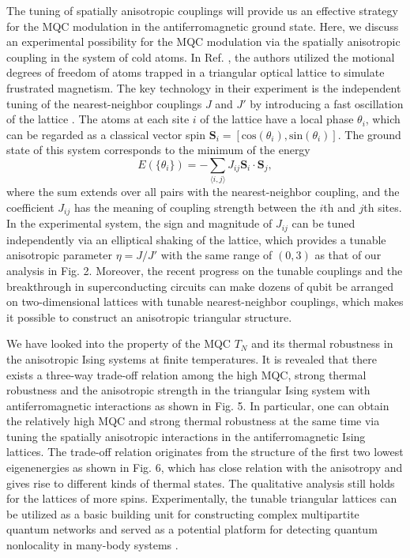 \documentclass[pra,aps,twocolumn,showpacs]{revtex4}
\begin{document}
The tuning of spatially anisotropic couplings will provide us an effective strategy for the MQC modulation in the antiferromagnetic ground state. Here, we discuss an experimental possibility for the MQC modulation via the spatially anisotropic coupling in the system of cold atoms. In Ref. \cite{Struck11sci}, the authors utilized the motional degrees of freedom of atoms trapped in a triangular optical lattice to simulate frustrated magnetism. The key technology in their experiment is the independent tuning of the nearest-neighbor couplings $J$ and $J'$ by introducing a fast oscillation of the lattice \cite{eckardt10epl}. The atoms at each site $i$ of the lattice have a local phase $\theta_i$, which can be regarded as a classical vector spin $\textbf{S}_i=[\mbox{cos}(\theta_i), \mbox{sin}(\theta_i)]$. The ground state of this system corresponds to the minimum of the energy \cite{Struck11sci}
\begin{equation}
    E(\{\theta_i\})=-\sum_{\langle i, j\rangle} J_{i j} \mathbf{S}_{i} \cdot \mathbf{S}_{j},
\end{equation}
where the sum extends over all pairs with the nearest-neighbor coupling, and the coefficient $J_{ij}$ has the meaning of coupling strength between the $i$th and $j$th sites. In the experimental system, the sign and magnitude of $J_{ij}$ can be tuned independently via an elliptical shaking of the lattice, which provides a tunable anisotropic parameter $\eta=J/J'$ with the same range of $(0,3)$ as that of our analysis in Fig. 2. Moreover, the recent progress on the tunable couplings \cite{chen14prl,Guo19prl,li20prapp} and the breakthrough in superconducting circuits \cite{Arute19nat,gong21sci,wu21prl,zhang22nat,feng22prapp} can make dozens of qubit be arranged on two-dimensional lattices with tunable nearest-neighbor couplings, which makes it possible to construct an anisotropic triangular structure.

We have looked into the property of the MQC $T_N$ and its thermal robustness in the anisotropic Ising systems at finite temperatures. It is revealed that there exists a three-way trade-off relation among the high MQC, strong thermal robustness and the anisotropic strength in the triangular Ising system with antiferromagnetic interactions as shown in Fig. 5. In particular, one can obtain the relatively high MQC and strong thermal robustness at the same time via tuning the spatially anisotropic interactions in the antiferromagnetic Ising lattices. The trade-off relation originates from the structure of the first two lowest eigenenergies as shown in Fig. 6, which has close relation with the anisotropy and gives rise to different kinds of thermal states. The qualitative analysis still holds for the lattices of more spins. Experimentally, the tunable triangular lattices can be utilized as a basic building unit for constructing complex multipartite quantum networks \cite{wehner18sci,zhong21nat} and served as a potential platform for detecting quantum nonlocality in many-body systems \cite{luo18prl,renou19prl,tejada21prl}.
\end{document}
